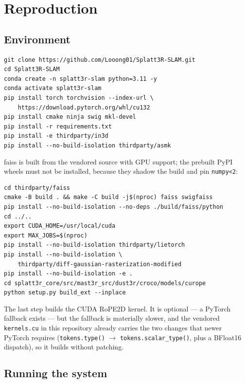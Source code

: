 \chapter{Reproduction}
\label{app:repro}

\section{Environment}

\begin{small}
\begin{verbatim}
git clone https://github.com/Looong01/Splatt3R-SLAM.git
cd Splatt3R-SLAM
conda create -n splatt3r-slam python=3.11 -y
conda activate splatt3r-slam
pip install torch torchvision --index-url \
    https://download.pytorch.org/whl/cu132
pip install cmake ninja swig mkl-devel
pip install -r requirements.txt
pip install -e thirdparty/in3d
pip install --no-build-isolation thirdparty/asmk
\end{verbatim}
\end{small}

\noindent
faiss is built from the vendored source with GPU support; the prebuilt PyPI
wheels must not be installed, because they shadow the build and pin
\texttt{numpy<2}:

\begin{small}
\begin{verbatim}
cd thirdparty/faiss
cmake -B build . && make -C build -j$(nproc) faiss swigfaiss
pip install --no-build-isolation --no-deps ./build/faiss/python
cd ../..
export CUDA_HOME=/usr/local/cuda
export MAX_JOBS=$(nproc)
pip install --no-build-isolation thirdparty/lietorch
pip install --no-build-isolation \
    thirdparty/diff-gaussian-rasterization-modified
pip install --no-build-isolation -e .
cd splatt3r_core/src/mast3r_src/dust3r/croco/models/curope
python setup.py build_ext --inplace
\end{verbatim}
\end{small}

\noindent
The last step builds the CUDA RoPE2D kernel. It is optional --- a PyTorch
fallback exists --- but the fallback is materially slower, and the vendored
\texttt{kernels.cu} in this repository already carries the two changes that
newer PyTorch requires (\texttt{tokens.type()} $\rightarrow$
\texttt{tokens.scalar\_type()}, plus a BFloat16 dispatch), so it builds
without patching.

\section{Running the system}

